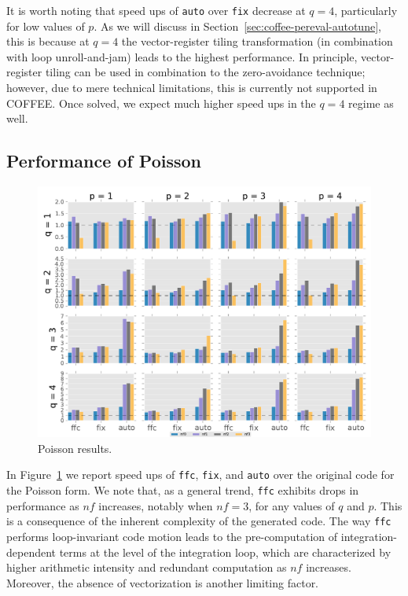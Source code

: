 It is worth noting that speed ups of \texttt{auto} over \texttt{fix} decrease at $q=4$, particularly for low values of $p$. As we will discuss in Section~\ref{sec:coffee-pereval-autotune}, this is because at $q=4$ the vector-register tiling transformation (in combination with loop unroll-and-jam) leads to the highest performance. In principle, vector-register tiling can be used in combination to the zero-avoidance technique; however, due to mere technical limitations, this is currently not supported in COFFEE. Once solved, we expect much higher speed ups in the $q=4$ regime as well.


\subsection{Performance of Poisson}
\begin{figure}[t]
\centerline{\includegraphics[scale=0.7]{coffee/perf-results/allforms/poisson}}
\caption{Poisson results.}\label{fig:coffee-allforms-poisson}
\end{figure}

In Figure~\ref{fig:coffee-allforms-poisson} we report speed ups of \texttt{ffc}, \texttt{fix}, and \texttt{auto} over the original code for the Poisson form. We note that, as a general trend, \texttt{ffc} exhibits drops in performance as $nf$ increases, notably when $nf=3$, for any values of $q$ and $p$. This is a consequence of the inherent complexity of the generated code. The way \texttt{ffc} performs loop-invariant code motion leads to the pre-computation of integration-dependent terms at the level of the integration loop, which are characterized by higher arithmetic intensity and redundant computation as $nf$ increases. Moreover, the absence of vectorization is another limiting factor.

